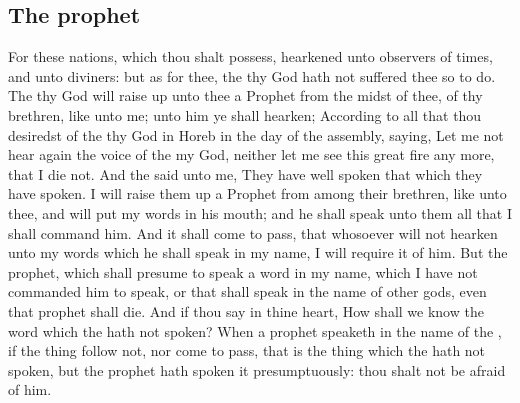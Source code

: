\begin{biblechapter}
\section*{The prophet}
\verse For these nations, which thou shalt possess, hearkened unto observers of times, and unto diviners: but as for thee, the \LORD thy God hath not suffered thee so to do.
\verse The \LORD thy God will raise up unto thee a Prophet from the midst of thee, of thy brethren, like unto me; unto him ye shall hearken;
\verse According to all that thou desiredst of the \LORD thy God in Horeb in the day of the assembly, saying, Let me not hear again the voice of the \LORD my God, neither let me see this great fire any more, that I die not.
\verse And the \LORD said unto me, They have well spoken that which they have spoken.
\verse I will raise them up a Prophet from among their brethren, like unto thee, and will put my words in his mouth; and he shall speak unto them all that I shall command him.
\verse And it shall come to pass, that whosoever will not hearken unto my words which he shall speak in my name, I will require it of him.
\verse But the prophet, which shall presume to speak a word in my name, which I have not commanded him to speak, or that shall speak in the name of other gods, even that prophet shall die.
\verse And if thou say in thine heart, How shall we know the word which the \LORD hath not spoken?
\verse When a prophet speaketh in the name of the \LORD, if the thing follow not, nor come to pass, that is the thing which the \LORD hath not spoken, but the prophet hath spoken it presumptuously: thou shalt not be afraid of him.
\end{biblechapter}

